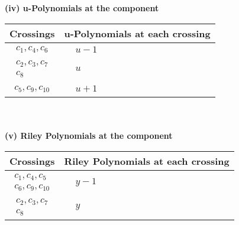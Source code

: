 \documentclass[1p]{elsarticle_modified}
\theoremstyle{definition}
\begin{document}
\newpage\renewcommand{\arraystretch}{1}
\flushleft \textbf{(iv) u-Polynomials at the component}\newline \\
\begin{tabular}{m{50pt}|m{274pt}}
Crossings & \hspace{64pt}u-Polynomials at each crossing \\
\hline $$\begin{aligned}c_{1},c_{4},c_{6}\end{aligned}$$&$\begin{aligned}
&u-1
\end{aligned}$\\
\hline $$\begin{aligned}c_{2},c_{3},c_{7}\\c_{8}\end{aligned}$$&$\begin{aligned}
&u
\end{aligned}$\\
\hline $$\begin{aligned}c_{5},c_{9},c_{10}\end{aligned}$$&$\begin{aligned}
&u+1
\end{aligned}$\\
\hline
\end{tabular}\\~\\
\newpage\renewcommand{\arraystretch}{1}
\flushleft \textbf{(v) Riley Polynomials at the component}\newline \\
\begin{tabular}{m{50pt}|m{274pt}}
Crossings & \hspace{64pt}Riley Polynomials at each crossing \\
\hline $$\begin{aligned}c_{1},c_{4},c_{5}\\c_{6},c_{9},c_{10}\end{aligned}$$&$\begin{aligned}
&y-1
\end{aligned}$\\
\hline $$\begin{aligned}c_{2},c_{3},c_{7}\\c_{8}\end{aligned}$$&$\begin{aligned}
&y
\end{aligned}$\\
\hline
\end{tabular}\\~\\
\end{document}
